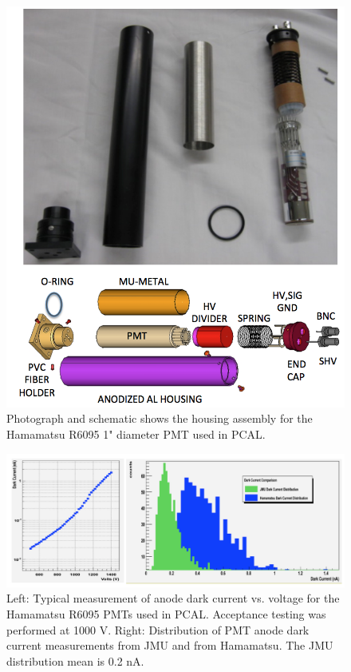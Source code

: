 \begin{figure}[hbt]
\centering
\includegraphics[width=0.85\columnwidth,keepaspectratio]{img/S4_PMT.png}
\caption{Photograph and schematic shows the housing assembly for the Hamamatsu R6095 1" diameter PMT used in PCAL.}
\label{fig:S4_PMT}
\end{figure}

\begin{figure}[hbt]
\centering
\includegraphics[width=1.0\columnwidth,keepaspectratio]{img/S4_PMT_2.png}
\caption{Left: Typical measurement of anode dark current vs. voltage for the Hamamatsu R6095 PMTs used in PCAL. Acceptance testing was performed at 1000 V.  Right: Distribution of PMT anode dark current measurements from JMU and from Hamamatsu.  The JMU distribution mean is 0.2 nA.}
\label{fig:S4_PMT_2}
\end{figure}

